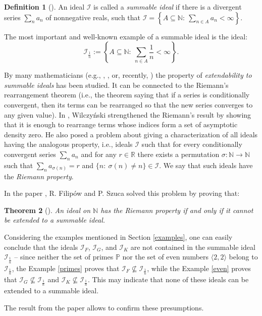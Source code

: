 \documentclass{amsart}
\newtheorem{thm}{Theorem}[section]
\theoremstyle{definition}
\newtheorem{df}[thm]{Definition}
\newcommand{\N}{{\mathbb N}}
\newcommand{\R}{{\mathbb R}}
\newcommand{\I}{\mathcal I}
\newcommand{\arithseq}[2]{\langle#2, #1\rangle}
\begin{document}
\begin{df}[\cite{Maz}]
An ideal $\I$ is called a \emph{summable ideal} if there is a divergent series $\sum_{n}{a_n}$ of nonnegative reals, such that $\I=\left\{A\subseteq \N :\ \sum_{n\in A}{a_n} <\infty\right\}$.
\end{df}

The most important and well-known example of a summable ideal is the ideal:  
$$\I_{\frac{1}{n}} := \left\{A\subseteq \N :\ \sum_{n\in A}{\frac{1}{n}} <\infty\right\}.$$

By many mathematicians (e.g., \cite{Au}, \cite{FreedSem}, or, recently, \cite{Klinga}) the property of \emph{extendability to summable ideals} has been studied. It can be connected to the Riemann's rearrangement theorem (i.e., the theorem saying that if a series is conditionally convergent, then its terms can be rearranged so that the new series converges to any given value). In \cite{W}, Wilczy\'nski strengthened the Riemann's result by showing that it is enough to rearrange terms whose indices form a set of asymptotic density zero. He also posed a problem about giving a characterization of all ideals having the analogous property, i.e., ideals $\I$ such that for every conditionally convergent series $\sum_n{a_n}$ and for any $r\in\R$ there exists a permutation $\sigma \colon \N\to\N$ such that $\sum_n{a_{\sigma(n)}} = r$ and $\{n :\ \sigma(n)\neq n\}\in\I$. We say that such ideals have the \emph{Riemann property}.

In the paper \cite{H3}, R. Filip\'ow and P. Szuca solved this problem by proving that:
\begin{thm}[{\cite[Theorem 3.3]{H3}}]
An ideal on $\N$ has the Riemann property if and only if it cannot be extended to a summable ideal.
\end{thm}

Considering the examples mentioned in Section \ref{examples}, one can easily conclude that the ideals $\I_F$, $\I_G$, and $\I_K$ are not contained in the summable ideal $\I_{\frac{1}{n}}$ -- since neither the set of primes $\mathbb{P}$ nor the set of even numbers $\arithseq{2}{2}$ belong to $\I_{\frac{1}{n}}$, the Example \ref{primes} proves that $\I_F \not\subseteq \I_{\frac{1}{n}}$, while the Example \ref{even} proves that $\I_G \not\subseteq \I_{\frac{1}{n}}$ and $\I_K \not\subseteq \I_{\frac{1}{n}}$.
This may indicate that none of these ideals can be extended to a summable ideal.

The result from the paper \cite{H3} allows to confirm these presumptions.
\end{document}
